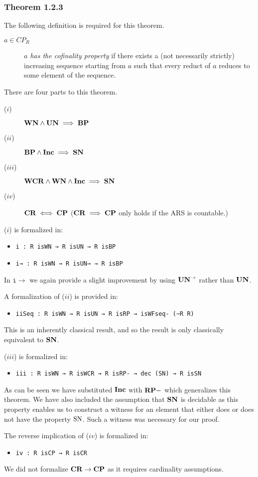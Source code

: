 \subsubsection{Theorem 1.2.3}
The following definition is required for this theorem.
\begin{definition}\hfill
    \begin{description}
        \item[$a \in CP_R$] \emph{$a$ has the cofinality property} if there exists a 
        (not necessarily strictly) increasing sequence starting from $a$ such that every
        reduct of $a$ reduces to some element of the sequence.
    \end{description}
\end{definition}

There are four parts to this theorem. 
\begin{description}
    \item[($i$)] $\mathbf{WN} \land \mathbf{UN} \implies \mathbf{BP}$
    \item[($ii$)] $\mathbf{BP} \land \mathbf{Inc} \implies \mathbf{SN}$  
    \item[($iii$)] $\mathbf{WCR} \land \mathbf{WN} \land \mathbf{Inc} \implies \mathbf{SN}$
    \item[($iv$)] $\mathbf{CR} \iff \mathbf{CP}$ ($\mathbf{CR} \implies \mathbf{CP}$ only holds if the ARS is countable.)
\end{description}

($i$) is formalized in: 
\begin{itemize}
    \item \verb|i : R isWN → R isUN → R isBP|
    \item \verb|i→ : R isWN → R isUN→ → R isBP|
\end{itemize}

In $\mathtt{i\to}$ we again provide a slight improvement by using $\mathbf{UN}^{\to}$ rather than $\mathbf{UN}$.

A formalization of ($ii$) is provided in: 
\begin{itemize}
    \item \verb|iiSeq : R isWN → R isUN → R isRP → isWFseq- (~R R)|
\end{itemize}
This is an inherently classical result, and so the result is only classically equivalent to $\mathbf{SN}$.

($iii$) is formalized in: 
\begin{itemize}
    \item \verb|iii : R isWN → R isWCR → R isRP- → dec (SN) → R isSN|
\end{itemize}
As can be seen we have substituted $\mathbf{Inc}$ with $\mathbf{RP{-}}$ which generalizes this theorem. We have also included the assumption that $\mathbf{SN}$ 
is decidable as this property enables us 
to construct a witness for an element that either does or does not have the property $\mathrm{SN}$. Such a witness was necessary for our proof. 


The reverse implication of ($iv$) is formalized in: 
\begin{itemize}
    \item \verb|iv : R isCP → R isCR|
\end{itemize}
We did not formalize $\mathbf{CR} \to \mathbf{CP}$ as it requires cardinality assumptions.



